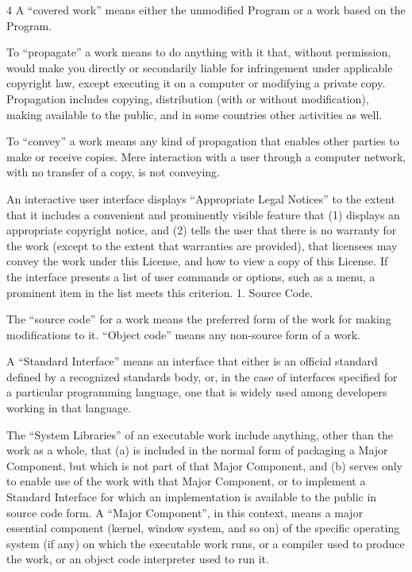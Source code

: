 \documentclass[fontsize=11pt,paper=A4,BCOR=12mm,DIV=13,open=any,listof=totoc,toc=flat]{scrbook}
\begin{document}
{\begin{multicols}{4}
A “covered work” means either the unmodified Program or a work based on the Program.

To “propagate” a work means to do anything with it that, without permission, would make you directly or secondarily liable for infringement under applicable copyright law, except executing it on a computer or modifying a private copy. Propagation includes copying, distribution (with or without modification), making available to the public, and in some countries other activities as well.

To “convey” a work means any kind of propagation that enables other parties to make or receive copies. Mere interaction with a user through a computer network, with no transfer of a copy, is not conveying.

An interactive user interface displays “Appropriate Legal Notices” to the extent that it includes a convenient and prominently visible feature that (1) displays an appropriate copyright notice, and (2) tells the user that there is no warranty for the work (except to the extent that warranties are provided), that licensees may convey the work under this License, and how to view a copy of this License. If the interface presents a list of user commands or options, such as a menu, a prominent item in the list meets this criterion.
1. Source Code.

The “source code” for a work means the preferred form of the work for making modifications to it. “Object code” means any non-source form of a work.

A “Standard Interface” means an interface that either is an official standard defined by a recognized standards body, or, in the case of interfaces specified for a particular programming language, one that is widely used among developers working in that language.

The “System Libraries” of an executable work include anything, other than the work as a whole, that (a) is included in the normal form of packaging a Major Component, but which is not part of that Major Component, and (b) serves only to enable use of the work with that Major Component, or to implement a Standard Interface for which an implementation is available to the public in source code form. A “Major Component”, in this context, means a major essential component (kernel, window system, and so on) of the specific operating system (if any) on which the executable work runs, or a compiler used to produce the work, or an object code interpreter used to run it.


\end{multicols}}
\end{document}
